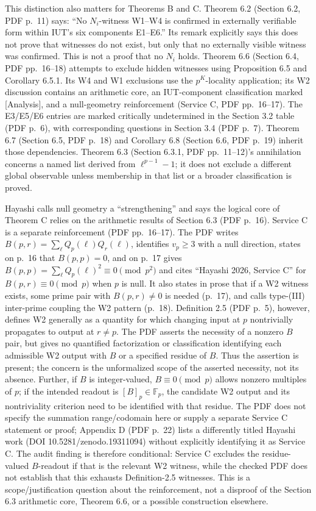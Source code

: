 \documentclass[11pt]{article}
\begin{document}
This distinction also matters for Theorems B and C. Theorem 6.2 (Section 6.2, PDF p.~11) says: ``No $N_i$-witness W1--W4 is confirmed in externally verifiable form within IUT's six components E1--E6.'' Its remark explicitly says this does not prove that witnesses do not exist, but only that no externally visible witness was confirmed. This is not a proof that no $N_i$ holds. Theorem 6.6 (Section 6.4, PDF pp.~16--18) attempts to exclude hidden witnesses using Proposition 6.5 and Corollary 6.5.1. Its W4 and W1 exclusions use the $p^K$-locality application; its W2 discussion contains an arithmetic core, an IUT-component classification marked [Analysis], and a null-geometry reinforcement (Service C, PDF pp.~16--17). The E3/E5/E6 entries are marked critically undetermined in the Section 3.2 table (PDF p.~6), with corresponding questions in Section 3.4 (PDF p.~7). Theorem 6.7 (Section 6.5, PDF p.~18) and Corollary 6.8 (Section 6.6, PDF p.~19) inherit those dependencies. Theorem 6.3 (Section 6.3.1, PDF pp.~11--12)'s annihilation concerns a named list derived from $\ell^{p-1}-1$; it does not exclude a different global observable unless membership in that list or a broader classification is proved.\par\smallskip
Hayashi calls null geometry a ``strengthening'' and says the logical core of Theorem C relies on the arithmetic results of Section 6.3 (PDF p.~16). Service C is a separate reinforcement (PDF pp.~16--17). The PDF writes $B(p,r)=\sum_{\ell}Q_p(\ell)Q_r(\ell)$, identifies $v_p\ge3$ with a null direction, states on p.~16 that $B(p,p)=0$, and on p.~17 gives $B(p,p)=\sum_{\ell}Q_p(\ell)^2\equiv0\pmod{p^2}$ and cites ``Hayashi 2026, Service C'' for $B(p,r)\equiv0\pmod p$ when $p$ is null. It also states in prose that if a W2 witness exists, some prime pair with $B(p,r)\ne0$ is needed (p.~17), and calls type-(III) inter-prime coupling the W2 pattern (p.~18). Definition 2.5 (PDF p.~5), however, defines W2 generally as a quantity for which changing input at $p$ nontrivially propagates to output at $r\ne p$. The PDF asserts the necessity of a nonzero $B$ pair, but gives no quantified factorization or classification identifying each admissible W2 output with $B$ or a specified residue of $B$. Thus the assertion is present; the concern is the unformalized scope of the asserted necessity, not its absence. Further, if $B$ is integer-valued, $B\equiv0\pmod p$ allows nonzero multiples of $p$; if the intended readout is $[B]_p\in\mathbb F_p$, the candidate W2 output and its nontriviality criterion need to be identified with that residue. The PDF does not specify the summation range/codomain here or supply a separate Service C statement or proof; Appendix D (PDF p.~22) lists a differently titled Hayashi work (DOI 10.5281/zenodo.19311094) without explicitly identifying it as Service C. The audit finding is therefore conditional: Service C excludes the residue-valued $B$-readout if that is the relevant W2 witness, while the checked PDF does not establish that this exhausts Definition-2.5 witnesses. This is a scope/justification question about the reinforcement, not a disproof of the Section 6.3 arithmetic core, Theorem 6.6, or a possible construction elsewhere.
\end{document}
